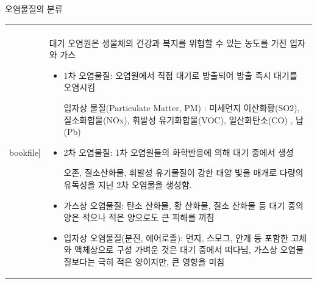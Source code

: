 \begin{frame}[t]{오염물질의 분류}
	\begin{tabular}{ll}
		\begin{minipage}[t]{0.45\textwidth}\scriptsize
			\begin{figure}[t]
				\texttt{[image: \\bookfile]}
			\end{figure}
		\end{minipage}	
		&
		\begin{minipage}[t]{0.5\textwidth} \scriptsize	
			대기 오염원은 생물체의 건강과 복지를 위협할 수 있는 농도를 가진 입자와 가스
			
			\begin{itemize}
				\item 1차 오염물질: 오염원에서 직접 대기로 방출되어 방출 즉시 대기를 오염시킴
				
				입자상 물질(Particulate Matter, PM) : 미세먼지
				이산화황(SO2), 질소화합물(NOx), 휘발성 유기화합물(VOC), 일산화탄소(CO) , 납(Pb)
				\item 2차 오염물질: 1차 오염원들의 화학반응에 의해 대기 중에서 생성
				
				오존, 질소산화물, 휘발성 유기물질이 강한 태양 빛을 매개로 다량의 유독성을 지닌 2차 오염물을 생성함. 

				\item 가스상 오염물질: 탄소 산화물, 황 산화물, 질소 산화물 등
				대기 중의 양은 적으나 적은 양으로도 큰 피해를 끼침
				
				\item 입자상 오염물질(분진, 에어로졸): 먼지, 스모그, 안개 등 포함한 고체와 액체상으로 구성
				가벼운 것은 대기 중에서 떠다님, 가스상 오염물질보다는 극히 적은 양이지만, 큰 영향을 미침
				
			\end{itemize}

		\end{minipage}
	\end{tabular}
\end{frame}



